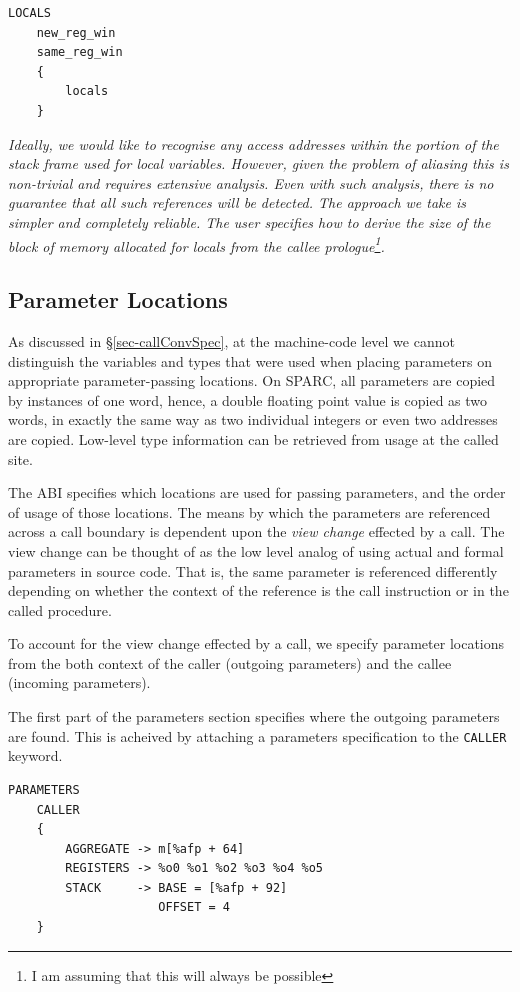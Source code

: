 \begin{verbatim}
LOCALS
    new_reg_win
    same_reg_win
    {
        locals
    }
\end{verbatim}

{\it Ideally, we would like to recognise any access addresses within
the portion of the stack frame used for local variables. However,
given the problem of aliasing this is non-trivial and requires
extensive analysis. Even with such analysis, there is no guarantee
that all such references will be detected. The approach we take is
simpler and completely reliable. The user specifies how to derive
the size of the block of memory allocated for locals from the callee
prologue\footnote{I am assuming that this will always be possible}.}

\subsection{Parameter Locations}

As discussed in \S\ref{sec-callConvSpec}, at the machine-code
level we cannot distinguish the variables and types that were used
when placing parameters on appropriate parameter-passing locations.
On SPARC, all parameters are copied by instances of one word, hence,
a double floating point value is copied as two words, in exactly
the same way as two individual integers or even two addresses are
copied.  Low-level type information can be retrieved from usage at
the called site.

The ABI specifies which locations are used for passing parameters,
and the order of usage of those locations. The means by which
the parameters are referenced across a call boundary is dependent
upon the {\it view change} effected by a call. The view change can
be thought of as the low level analog of using actual and formal
parameters in source code. That is, the same parameter is referenced
differently depending on whether the context of the reference is
the call instruction or in the called procedure.

To account for the view change effected by a call, we specify
parameter locations from the both context of the caller (outgoing
parameters) and the callee (incoming parameters).

The first part of the parameters section specifies where the outgoing
parameters are found. This is acheived by attaching a parameters
specification to the {\tt CALLER} keyword.

\begin{verbatim}
PARAMETERS
    CALLER
    {
        AGGREGATE -> m[%afp + 64]
        REGISTERS -> %o0 %o1 %o2 %o3 %o4 %o5
        STACK     -> BASE = [%afp + 92]
                     OFFSET = 4
    }
\end{verbatim}

